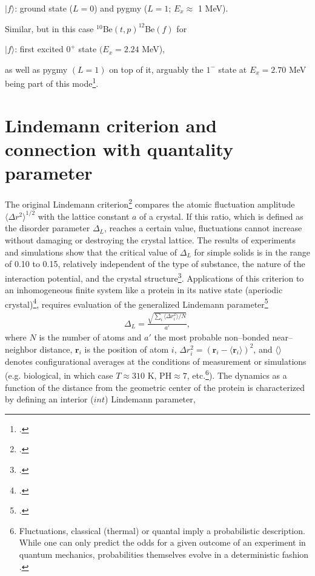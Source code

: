\begin{subappendices}
\vspace{0.1cm}
\vspace{0.2cm}
\centerline{$|f\rangle$: ground state ($L=0$) and pygmy ($L=1$; $E_x\approx$ 1 MeV).}
Similar, but in this case $^{10}$Be$(t,p)^{12}$Be$(f)$ for\\
\centerline{$|f\rangle$: first excited $0^+$ state $(E_x=2.24$ MeV),}
\vspace{0.2cm}
as well as pygmy $(L=1)$ on top of it, arguably the $1^-$ state at $E_x=2.70$ MeV being part of this mode\footnote{\cite{Iwasaki:00}.}.
\section[Lindemann criterion and  quantality parameter]{Lindemann criterion and connection with quantality parameter}\label{C2AppC}
The original Lindemann criterion\footnote{\cite{Lindemann:10}.} compares the atomic fluctuation amplitude $\langle\Delta r^2\rangle^{1/2}$ with the lattice constant $a$ of a crystal. If this ratio, which is defined as the disorder parameter $\Delta_L$, reaches a certain value, fluctuations cannot increase without damaging or destroying the crystal lattice. The results of experiments and simulations show that the critical value of $\Delta_L$ for simple solids is in the range of 0.10 to 0.15, relatively independent of the type of substance, the nature of the interaction potential, and the crystal structure\footnote{\cite{Bilgram:87,Lowen:94,Stillinger:95}.}. Applications of this criterion to an inhomogeneous finite system like a protein in its native state (aperiodic crystal)\footnote{\cite{Schrodinger:44}.}, requires evaluation of the generalized Lindemann parameter\footnote{\cite{Stillinger:90}.}
\begin{align}
\Delta_L=\frac{\sqrt{\sum_i\langle \Delta r_i^2\rangle/N}}{a'},
\end{align}  
where $N$ is the number of atoms and $a'$ the most probable non--bonded near--neighbor distance, $\mathbf r_i$ is the position of atom $i$, $\Delta r_i^2=(\mathbf r_i-\langle \mathbf r_i\rangle)^2$, and $\langle\rangle$ denotes configurational averages at the conditions of measurement or simulations (e.g. biological, in which case $T\approx 310$ K, PH$\approx 7$, etc.\footnote{Fluctuations, classical (thermal) or quantal imply a probabilistic description. While one can only predict the odds for a given outcome of an experiment in quantum mechanics, probabilities themselves evolve in a deterministic fashion \cite{Born:48}.}). The dynamics as a function of the distance from the geometric center of the protein is characterized by defining an interior ($int$) Lindemann parameter, 

\end{subappendices}
